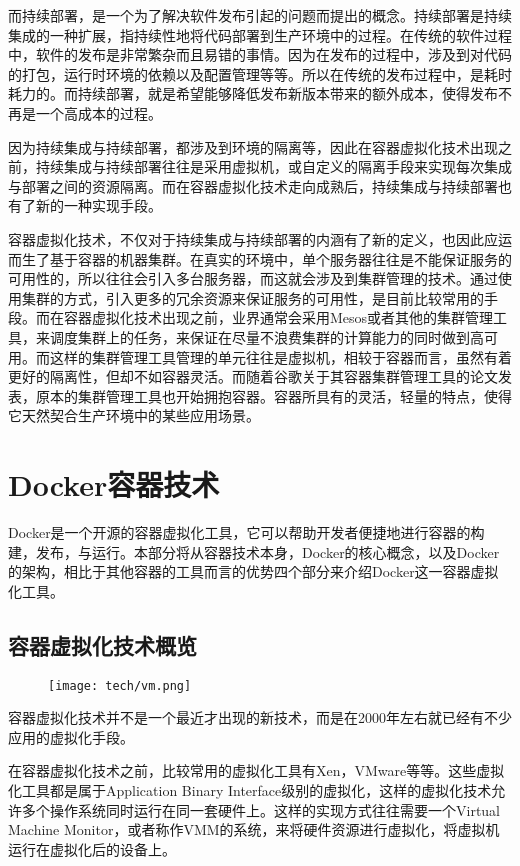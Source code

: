 而持续部署，是一个为了解决软件发布引起的问题而提出的概念。持续部署是持续集成的一种扩展，指持续性地将代码部署到生产环境中的过程。在传统的软件过程中，软件的发布是非常繁杂而且易错的事情。因为在发布的过程中，涉及到对代码的打包，运行时环境的依赖以及配置管理等等。所以在传统的发布过程中，是耗时耗力的。而持续部署，就是希望能够降低发布新版本带来的额外成本，使得发布不再是一个高成本的过程。\cite{CruiseControls}

因为持续集成与持续部署，都涉及到环境的隔离等，因此在容器虚拟化技术出现之前，持续集成与持续部署往往是采用虚拟机，或自定义的隔离手段来实现每次集成与部署之间的资源隔离。而在容器虚拟化技术走向成熟后，持续集成与持续部署也有了新的一种实现手段。

容器虚拟化技术，不仅对于持续集成与持续部署的内涵有了新的定义，也因此应运而生了基于容器的机器集群。在真实的环境中，单个服务器往往是不能保证服务的可用性的，所以往往会引入多台服务器，而这就会涉及到集群管理的技术。通过使用集群的方式，引入更多的冗余资源来保证服务的可用性，是目前比较常用的手段。而在容器虚拟化技术出现之前，业界通常会采用Mesos或者其他的集群管理工具，来调度集群上的任务，来保证在尽量不浪费集群的计算能力的同时做到高可用。而这样的集群管理工具管理的单元往往是虚拟机，相较于容器而言，虽然有着更好的隔离性，但却不如容器灵活。而随着谷歌关于其容器集群管理工具的论文发表\cite{Borg}，原本的集群管理工具也开始拥抱容器。容器所具有的灵活，轻量的特点，使得它天然契合生产环境中的某些应用场景。

\section{Docker容器技术}

Docker是一个开源的容器虚拟化工具，它可以帮助开发者便捷地进行容器的构建，发布，与运行。本部分将从容器技术本身，Docker的核心概念，以及Docker的架构，相比于其他容器的工具而言的优势四个部分来介绍Docker这一容器虚拟化工具。

\subsection{容器虚拟化技术概览}

\begin{figure}[!htp]
  \centering
  \texttt{[image: tech/vm.png]}
\end{figure}

容器虚拟化技术并不是一个最近才出现的新技术，而是在2000年左右就已经有不少应用的虚拟化手段。

在容器虚拟化技术之前，比较常用的虚拟化工具有Xen，VMware等等。这些虚拟化工具都是属于Application Binary Interface级别的虚拟化，这样的虚拟化技术允许多个操作系统同时运行在同一套硬件上。这样的实现方式往往需要一个Virtual Machine Monitor，或者称作VMM的系统，来将硬件资源进行虚拟化，将虚拟机运行在虚拟化后的设备上。


